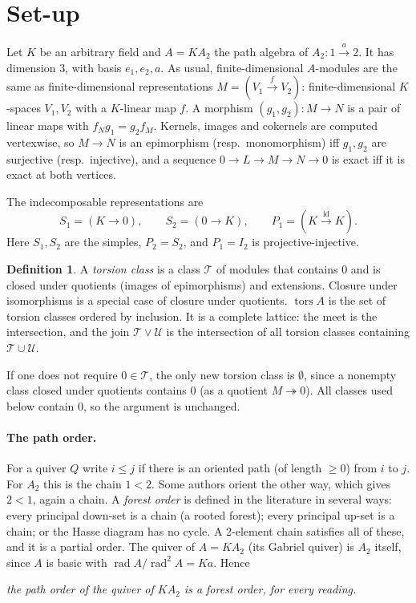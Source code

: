 \documentclass[11pt]{article}
\theoremstyle{definition}
\newtheorem{definition}[theorem]{Definition}
\theoremstyle{remark}
\newcommand{\tors}{\operatorname{tors}}
\begin{document}
\section{Set-up}

Let $K$ be an arbitrary field and $A=KA_2$ the path algebra of $A_2\colon 1\xrightarrow{\ a\ }2$.
It has dimension $3$, with basis $e_1,e_2,a$. As usual, finite-dimensional $A$-modules are the
same as finite-dimensional representations $M=(V_1\xrightarrow{f}V_2)$: finite-dimensional
$K$-spaces $V_1,V_2$ with a $K$-linear map $f$. A morphism $(g_1,g_2)\colon M\to N$ is a pair of
linear maps with $f_N g_1=g_2 f_M$. Kernels, images and cokernels are computed vertexwise, so
$M\to N$ is an epimorphism (resp.\ monomorphism) iff $g_1,g_2$ are surjective (resp.\ injective),
and a sequence $0\to L\to M\to N\to 0$ is exact iff it is exact at both vertices.

The indecomposable representations are
\[
S_1=(K\to 0),\qquad S_2=(0\to K),\qquad P_1=(K\xrightarrow{\ \mathrm{id}\ }K).
\]
Here $S_1,S_2$ are the simples, $P_2=S_2$, and $P_1=I_2$ is projective-injective.

\begin{definition}
A \emph{torsion class} is a class $\mathcal T$ of modules that contains $0$ and is closed under
quotients (images of epimorphisms) and extensions. Closure under isomorphisms is a special case
of closure under quotients. $\tors A$ is the set of torsion classes ordered by inclusion. It is a
complete lattice: the meet is the intersection, and the join $\mathcal T\vee\mathcal U$ is the
intersection of all torsion classes containing $\mathcal T\cup\mathcal U$.
\end{definition}

If one does not require $0\in\mathcal T$, the only new torsion class is $\emptyset$, since a nonempty class closed under
quotients contains $0$ (as a quotient $M\twoheadrightarrow 0$). All classes used
below contain $0$, so the argument is unchanged.

\paragraph{The path order.} For a quiver $Q$ write $i\le j$ if there is an oriented path (of
length $\ge0$) from $i$ to $j$. For $A_2$ this is the chain $1<2$. Some authors orient the other
way, which gives $2<1$, again a chain. A \emph{forest order} is defined in the literature in
several ways: every principal down-set is a chain (a rooted forest); every principal up-set is a
chain; or the Hasse diagram has no cycle. A 2-element chain satisfies all of these, and it is a
partial order. The quiver of $A=KA_2$ (its Gabriel quiver) is $A_2$ itself, since $A$ is basic
with $\operatorname{rad}A/\operatorname{rad}^2A=Ka$. Hence
\begin{center}
\emph{the path order of the quiver of $KA_2$ is a forest order, for every reading.}
\end{center}
\end{document}
